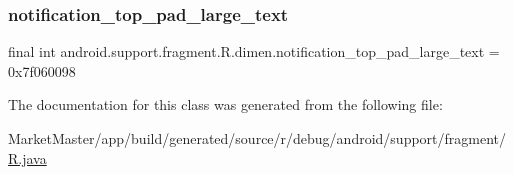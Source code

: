 \subsubsection{\texorpdfstring{notification\+\_\+top\+\_\+pad\+\_\+large\+\_\+text}{notification\_top\_pad\_large\_text}}
{\footnotesize\ttfamily final int android.\+support.\+fragment.\+R.\+dimen.\+notification\+\_\+top\+\_\+pad\+\_\+large\+\_\+text = 0x7f060098\hspace{0.3cm}{\ttfamily [static]}}



The documentation for this class was generated from the following file\+:\begin{DoxyCompactItemize}
\item 
Market\+Master/app/build/generated/source/r/debug/android/support/fragment/\mbox{\hyperlink{debug_2android_2support_2fragment_2R_8java}{R.\+java}}\end{DoxyCompactItemize}
